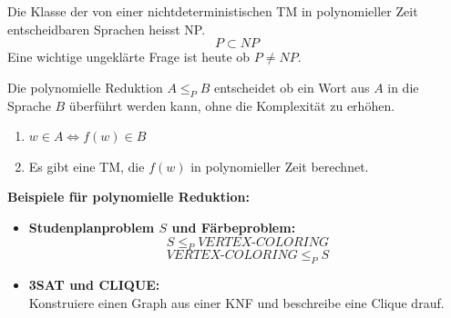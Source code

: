 \documentclass[a4paper]{article}
\begin{document}
	\begin{fdef}[Klasse NP]
	Die Klasse der von einer nichtdeterministischen TM in polynomieller Zeit entscheidbaren Sprachen heisst NP.
	$$P \subset NP$$
	Eine wichtige ungeklärte Frage ist heute ob $P \neq NP$.
	\end{fdef}
	
	\begin{falgo}
	Die polynomielle Reduktion $A \leq_P B$ entscheidet ob ein Wort aus $A$ in die Sprache $B$ überführt werden kann, ohne die Komplexität zu erhöhen.
	\begin{enumerate}
		\item $w \in A \Leftrightarrow f(w) \in B$
		\item Es gibt eine TM, die $f(w)$ in polynomieller Zeit berechnet.
	\end{enumerate}
	\end{falgo}
	
	\textbf{Beispiele für polynomielle Reduktion:}
	\begin{itemize}
		\item \textbf{Studenplanproblem $S$ und Färbeproblem:} 
			$$S \leq_P \textit{VERTEX-COLORING}$$
			$$\textit{VERTEX-COLORING} \leq_P S$$
		\item \textbf{3SAT und CLIQUE:} \\
			Konstruiere einen Graph aus einer KNF und beschreibe eine Clique drauf.
	\end{itemize}
	
	\newpage
\end{document}
